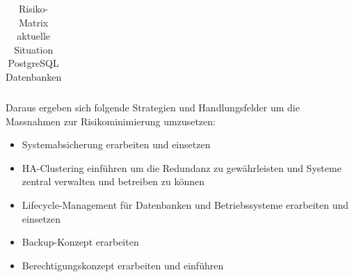 \begin{flushleft}
\begin{table}[H]
{\begin{tabular}{llllllllllll}
    \end{tabular}%
    }
    \caption{Risiko-Matrix aktuelle Situation PostgreSQL Datenbanken}
    \label{tab:riskmatrix-postgresql}
    \end{table}
\end{flushleft}


\clearpage
{}
\recalctypearea
\begin{flushleft}
    Daraus ergeben sich folgende Strategien und Handlungsfelder um die Massnahmen zur Risikominimierung umzusetzen:
    \begin{itemize}
        \item Systemabsicherung erarbeiten und einsetzen
        \item HA-Clustering einführen um die Redundanz zu gewährleisten und Systeme zentral verwalten und betreiben zu können
        \item Lifecycle-Management für Datenbanken und Betriebssysteme erarbeiten und einsetzen
        \item Backup-Konzept erarbeiten
        \item Berechtigungskonzept erarbeiten und einführen
    \end{itemize}
\end{flushleft}
